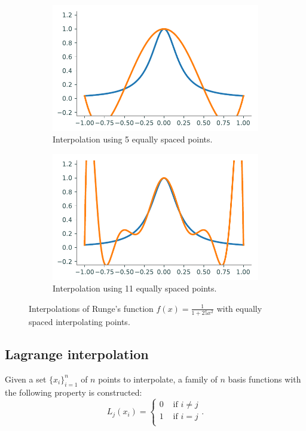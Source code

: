 \begin{figure}
\captionsetup[subfigure]{justification=centering}
\captionsetup{justification=centering}
\centering
\begin{subfigure}{.5\textwidth}
    \centering
    \includegraphics[width=\linewidth]{figures/bad_interp1.pdf}
    \caption{Interpolation using 5 equally spaced points.}
    \label{fig:bad1}
\end{subfigure}%
\begin{subfigure}{.5\textwidth}
    \centering
    \includegraphics[width=\linewidth]{figures/bad_interp2.pdf}
    \caption{Interpolation using 11 equally spaced points.}
    \label{fig:bad2}
\end{subfigure}
\caption{Interpolations of Runge's function $f(x)=\frac{1}{1+25x^2}$ with equally spaced interpolating points.}
\label{fig:badinterp}
\end{figure}

\subsection*{Lagrange interpolation} %
Given a set $\{x_i\}_{i=1}^n$ of $n$ points to interpolate, a family of $n$ basis functions with the following property is constructed:
\[
L_j(x_i) = \begin{cases} 0 &\mbox{ if } i \neq j\\ 1 &\mbox{ if } i =j \\ \end{cases}.
\]

